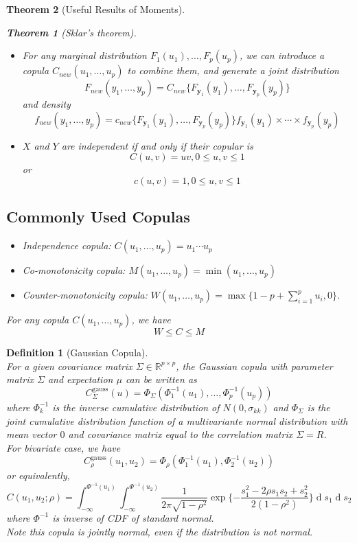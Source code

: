 \documentclass[12pt]{article}
\newtheorem{definition}{Definition}[section]
\newtheorem{theorem}{Theorem}[section]
\theoremstyle{definition}
\DeclareMathOperator{\diff}{d}
\begin{document}
\begin{theorem}[Useful Results of Moments]
\begin{theorem}[Sklar's theorem]
\begin{itemize}
\[  \]
  \item For any marginal distribution $F_1(u_1),\ldots, F_p(u_p)$, we can introduce a copula $C_{new}(u_1, \ldots, u_p)$ to combine them, and generate a joint distribution
  \[
F_{new}(y_1, \ldots, y_p)=C_{new}\{F_{\mathbf{y}_1}(y_1), \ldots, F_{\mathbf{y}_p}(y_p)\}
  \]
  and density
  \[
f_{new}(y_1, \ldots, y_p) =c_{new}\{F_{\mathbf{y}_1}(y_1), \ldots, F_{\mathbf{y}_p}(y_p)\}f_{\mathbf{y}_1}(y_1)\times\cdots\times f_{\mathbf{y}_p}(y_p)
  \]
  \item $X$ and $Y$ are independent if and only if their copular is
  \[
C(u,v)=uv, 0\leq u,v\leq 1
  \]
  or
  \[
c(u,v)=1, 0\leq u,v\leq 1
  \]
\end{itemize}
\end{theorem}
\subsection{Commonly Used Copulas}
\begin{itemize}
  \item Independence copula: $C(u_1,\ldots, u_p)=u_1\cdots u_p$
  \item Co-monotonicity copula: $M(u_1,\ldots, u_p) = \min(u_1,\ldots, u_p)$
  \item Counter-monotonicity copula: $W(u_1,\ldots, u_p) = \max\{1-p+\sum_{i=1}^p u_i, 0\}$.
\end{itemize}
For any copula $C(u_1,\ldots, u_p)$, we have
\[
W\leq C\leq M
\]
\end{theorem}
\begin{definition}[Gaussian Copula]
\hfill\\\normalfont For a given covariance matrix $\Sigma\in\mathbb{R}^{p\times p}$, the Gaussian copula with parameter matrix $\Sigma$ and expectation $\mu$ can be written as
\[
C_{\Sigma}^{\text{gauss}}(u)=\Phi_{\Sigma}(\Phi_1^{-1}(u_1),\ldots, \Phi_p^{-1}(u_p))
\]
where $\Phi_{k}^{-1}$ is the inverse cumulative distribution of $N(0,\sigma_{kk})$ and $\Phi_{\Sigma}$ is the joint cumulative distribution function of a multivariante normal distribution with mean vector $0$ and covariance matrix equal to the correlation matrix $\Sigma = R$.\\
For bivariate case, we have
\[
C_\rho^{\text{gauss}}(u_1, u_2) = \Phi_\rho(\Phi_{1}^{-1}(u_1), \Phi_2^{-1}(u_2))
\]
or equivalently,
\[
C(u_1, u_2; \rho) = \int_{-\infty}^{\Phi^{-1}(u_1)}\int_{-\infty}^{\Phi^{-1}(u_2)}\frac{1}{2\pi\sqrt{1-\rho^2}}\exp\{-\frac{s_1^2-2\rho s_1s_2+s_2^2}{2(1-\rho^2)}\}\diff s_1\diff s_2
\]
where $\Phi^{-1}$ is inverse of CDF of standard normal.\\
Note this copula is jointly normal, even if the distribution is not normal.
\end{definition}
\end{document}
